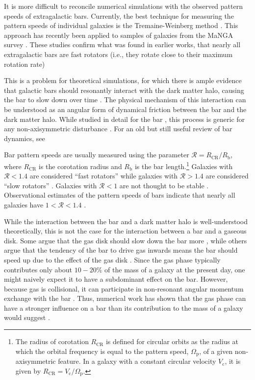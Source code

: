 \documentclass[fleqn,usenatbib]{mnras}
\newcommand{\RCR}{\ensuremath{R_{\textrm{CR}}}}
\newcommand{\Rot}{\ensuremath{\mathcal{R}}}
\newcommand{\Vc}{\ensuremath{V_{\textrm{c}} }}
\newcommand{\PS}{\ensuremath{\Omega_{\textrm{p}}}}
\newcommand{\Rb}{\ensuremath{R_{\textrm{b}}}}
\begin{document}
It is more difficult to reconcile numerical simulations with the observed
pattern speeds of extragalactic bars. Currently, the best technique for
measuring the pattern speeds of individual galaxies is the Tremaine-Weinberg
method \citep{1984ApJ...282L...5T, 2011MSAIS..18...23C}. This approach has
recently been applied to samples of galaxies from the MaNGA survey
\citep{2019MNRAS.482.1733G, 2020MNRAS.491.3655G}. These studies confirm
what was found in earlier works, that nearly all extragalactic bars are fast
rotators (i.e., they rotate close to their maximum rotation rate)

This is a problem for theoretical simulations, for which there is ample evidence
that galactic bars should resonantly interact with the dark matter halo, causing
the bar to slow down over time \citep{1992ApJ...400...80H, 2000ApJ...543..704D,
2002MNRAS.330...35A, 2002ApJ...569L..83A, 2003MNRAS.341.1179A,
2003MNRAS.346..251O, 2005MNRAS.363..991H, 2006ApJ...637..214M,
2007MNRAS.375..460W, 2009ApJ...697..293D}. The physical mechanism of this
interaction can be understood as an angular form of dynamical friction between
the bar and the dark matter halo. While studied in detail for the bar
\citep{1984MNRAS.209..729T, 1985MNRAS.213..451W}, this process is generic for
any non-axisymmetric disturbance \citep{1972MNRAS.157....1L}. For an old but
still useful review of bar dynamics, see \citet{1993RPPh...56..173S}

Bar pattern speeds are usually measured using the parameter $\Rot=\RCR/\Rb$,
where \RCR{} is the corotation radius and \Rb{} is the bar length.\footnote{The
radius of corotation \RCR{} is defined for circular orbits as the radius at
which the orbital frequency is equal to the pattern speed, \PS{}, of a given
non-axisymmetric feature. In a galaxy with a constant circular velocity \Vc{},
it is given by $\RCR = \Vc / \PS$.} Galaxies with $\Rot < 1.4$ are considered
``fast rotators'' while galaxies with $\Rot > 1.4$ are considered ``slow
rotators'' \citep{2000ApJ...543..704D}. Galaxies with $\Rot < 1$ are not thought
to be stable \citep{1980AA....81..198C}. Observational estimates of the pattern
speeds of bars indicate that nearly all galaxies have $1 < \Rot <
1.4$ \citep{2011MSAIS..18...23C, 2015AA...576A.102A, 2019MNRAS.482.1733G,
2020MNRAS.491.3655G}.

While the interaction between the bar and a dark matter halo is well-understood
theoretically, this is not the case for the interaction between a bar and a
gaseous disk. Some argue that the gas disk should slow down the bar more
\citep{2003MNRAS.341.1179A}, while others argue that the tendency of the bar to
drive gas inwards means the bar should speed up due to the effect of the gas
disk \citep{2013MNRAS.429.1949A, 2014MNRAS.438L..81A}. Since the gas phase
typically contributes only about $10-20\%$ of the mass of a galaxy at the
present day, one might naively expect it to have a subdominant effect on the
bar. However, because gas is collisional, it can participate in non-resonant
angular momentum exchange with the bar \citep{2011MNRAS.415.1027H}. Thus,
numerical work has shown that the gas phase can have a stronger influence on a
bar than its contribution to the mass of a galaxy would suggest
\citep{2010ApJ...719.1470V, 2013MNRAS.429.1949A}.
\end{document}
